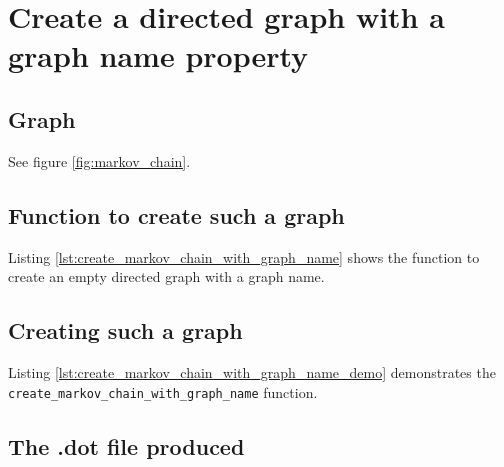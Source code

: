 

\section{Create a directed graph with a graph name property}
\label{subsec:create_markov_chain_with_graph_name}

\subsection{Graph}

See figure \ref{fig:markov_chain}.

\subsection{Function to create such a graph}

Listing \ref{lst:create_markov_chain_with_graph_name}
shows the function to create an empty directed graph with a graph name.



\subsection{Creating such a graph}

Listing 
\ref{lst:create_markov_chain_with_graph_name_demo}
demonstrates the \verb;create_markov_chain_with_graph_name; function.



\subsection{The .dot file produced}

%
%
%

